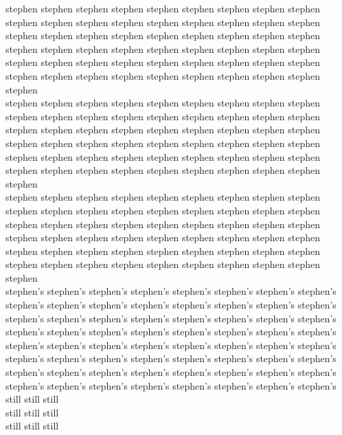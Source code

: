 stephen stephen stephen stephen stephen stephen stephen stephen stephen stephen stephen stephen stephen stephen stephen stephen stephen stephen stephen stephen stephen stephen stephen stephen stephen stephen stephen stephen stephen stephen stephen stephen stephen stephen stephen stephen stephen stephen stephen stephen stephen stephen stephen stephen stephen stephen stephen stephen stephen stephen stephen stephen stephen stephen stephen\\
stephen stephen stephen stephen stephen stephen stephen stephen stephen stephen stephen stephen stephen stephen stephen stephen stephen stephen stephen stephen stephen stephen stephen stephen stephen stephen stephen stephen stephen stephen stephen stephen stephen stephen stephen stephen stephen stephen stephen stephen stephen stephen stephen stephen stephen stephen stephen stephen stephen stephen stephen stephen stephen stephen stephen\\
stephen stephen stephen stephen stephen stephen stephen stephen stephen stephen stephen stephen stephen stephen stephen stephen stephen stephen stephen stephen stephen stephen stephen stephen stephen stephen stephen stephen stephen stephen stephen stephen stephen stephen stephen stephen stephen stephen stephen stephen stephen stephen stephen stephen stephen stephen stephen stephen stephen stephen stephen stephen stephen stephen stephen\\
stephen's stephen's stephen's stephen's stephen's stephen's stephen's stephen's\\
stephen's stephen's stephen's stephen's stephen's stephen's stephen's stephen's\\
stephen's stephen's stephen's stephen's stephen's stephen's stephen's stephen's\\
stephen's stephen's stephen's stephen's stephen's stephen's stephen's stephen's\\
stephen's stephen's stephen's stephen's stephen's stephen's stephen's stephen's\\
stephen's stephen's stephen's stephen's stephen's stephen's stephen's stephen's\\
stephen's stephen's stephen's stephen's stephen's stephen's stephen's stephen's\\
stephen's stephen's stephen's stephen's stephen's stephen's stephen's stephen's\\
still still still\\
still still still\\
still still still\\
